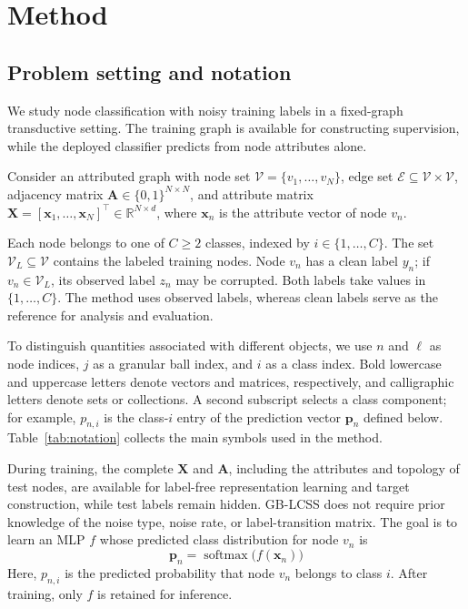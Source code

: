 \documentclass[10pt,letterpaper,nopreprintline]{elsarticle}
\theoremstyle{definition}
\theoremstyle{plain}
\begin{document}
\FloatBarrier

\section{Method}\label{sec:3}

\subsection{Problem setting and notation}\label{sec:3.1}

We study node classification with noisy training labels in a fixed-graph transductive setting. The training graph is available for constructing supervision, while the deployed classifier predicts from node attributes alone.

Consider an attributed graph with node set \(\mathcal V=\{v_1,\ldots,v_N\}\), edge set \(\mathcal E\subseteq\mathcal V\times\mathcal V\), adjacency matrix \(\mathbf A\in\{0,1\}^{N\times N}\), and attribute matrix \(\mathbf X=[\mathbf x_1,\ldots,\mathbf x_N]^\top\in\mathbb R^{N\times d}\), where \(\mathbf x_n\) is the attribute vector of node \(v_n\).

Each node belongs to one of \(C\geq2\) classes, indexed by \(i\in\{1,\ldots,C\}\). The set \(\mathcal V_L\subseteq\mathcal V\) contains the labeled training nodes. Node \(v_n\) has a clean label \(y_n\); if \(v_n\in\mathcal V_L\), its observed label \(z_n\) may be corrupted. Both labels take values in \(\{1,\ldots,C\}\). The method uses observed labels, whereas clean labels serve as the reference for analysis and evaluation.

To distinguish quantities associated with different objects, we use \(n\) and \(\ell\) as node indices, \(j\) as a granular ball index, and \(i\) as a class index. Bold lowercase and uppercase letters denote vectors and matrices, respectively, and calligraphic letters denote sets or collections. A second subscript selects a class component; for example, \(p_{n,i}\) is the class-\(i\) entry of the prediction vector \(\mathbf p_n\) defined below. Table~\ref{tab:notation} collects the main symbols used in the method.



During training, the complete \(\mathbf X\) and \(\mathbf A\), including the attributes and topology of test nodes, are available for label-free representation learning and target construction, while test labels remain hidden. GB-LCSS does not require prior knowledge of the noise type, noise rate, or label-transition matrix. The goal is to learn an MLP \(f\) whose predicted class distribution for node \(v_n\) is
\begin{equation}\label{eq:1}
\mathbf p_n=\operatorname{softmax}\bigl(f(\mathbf x_n)\bigr)
\end{equation}
Here, \(p_{n,i}\) is the predicted probability that node \(v_n\) belongs to class \(i\). After training, only \(f\) is retained for inference.
\end{document}
